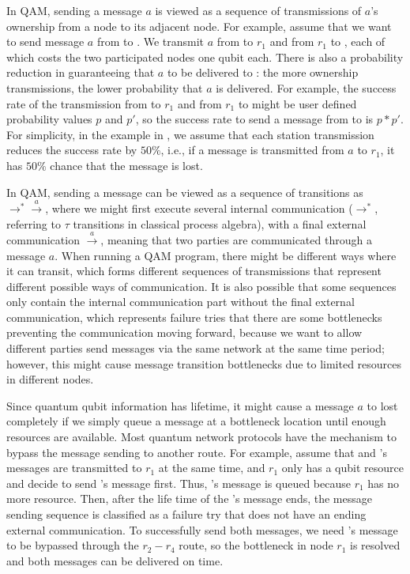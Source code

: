 In QAM, sending a message $a$ is viewed as a sequence of transmissions of $a$'s ownership from a node to its adjacent node.
For example, assume that we want to send message $a$ from  to .
We transmit $a$ from  to $r_1$ and from $r_1$ to , 
each of which costs the two participated nodes one qubit each.
There is also a probability reduction in guaranteeing that $a$ to be delivered to :
the more ownership transmissions, the lower probability that $a$ is delivered.
For example, the success rate of the transmission from  to $r_1$ and from $r_1$ to  might be user defined probability values $p$ and $p'$, so the success rate to send a message from  to  is $p * p'$.
For simplicity, in the example in , we assume that each station transmission reduces the success rate by $50\%$,
i.e., if a message is transmitted from $a$ to $r_1$, it has $50\%$ chance that the message is lost.

In QAM, sending a message can be viewed as a sequence of transitions as $\to^{*}\xrightarrow{a}$,
where we might first execute several internal communication ($\to^{*}$, referring to $\tau$ transitions in classical process algebra),
with a final external communication $\xrightarrow{a}$, meaning that two parties are communicated through a message $a$.
When running a QAM program, there might be different ways where it can transit, which forms different sequences of transmissions that represent different possible ways of communication. It is also possible that some sequences only contain the internal communication part without the final external communication, which represents failure tries that there are some bottlenecks preventing the communication moving forward, because we want to allow different parties send messages via the same network at the same time period; however, this might cause message transition bottlenecks due to limited resources in different nodes.

Since quantum qubit information has lifetime, it might cause a message $a$ to lost completely if we simply queue a message at a bottleneck location until enough resources are available. Most quantum network protocols have the mechanism to bypass the message sending to another route. For example, assume that  and 's messages are transmitted to $r_1$ at the same time, and $r_1$ only has a qubit resource and decide to send 's message first. Thus, 's message is queued because $r_1$ has no more resource. Then, after the life time of the 's message ends, the message sending sequence is classified as a failure try that does not have an ending external communication. To successfully send both messages, we need 's message to be bypassed through the $r_2 - r_4$ route, so the bottleneck in node $r_1$ is resolved and both messages can be delivered on time.

